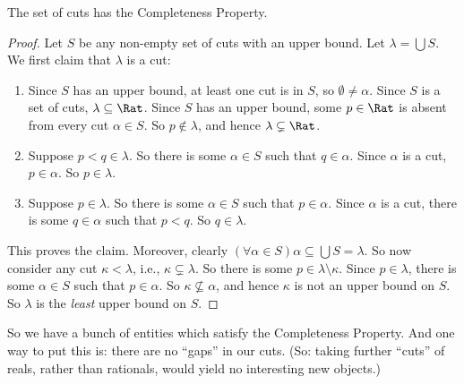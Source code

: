 \documentclass[../../../include/open-logic-section]{subfiles}
\begin{document}
\begin{thm}
The set of cuts has the Completeness Property. 
\end{thm}

\begin{proof}
Let $S$ be any non-empty set of cuts with an upper bound. Let $\lambda
= \bigcup S$. 
We first claim that $\lambda$ is a cut:
\begin{enumerate}
\item Since $S$ has an upper bound, at least one cut is in $S$, so
$\emptyset \neq \alpha$. Since $S$ is a set of cuts, $\lambda
\subseteq \Rat$. Since $S$ has an upper bound, some $p \in \Rat$ is
absent from every cut $\alpha \in S$. So $p\notin \lambda$, and hence
$\lambda \subsetneq \Rat$.
\item Suppose $p < q \in \lambda$. So there is some $\alpha \in S$
such that $q \in \alpha$. Since $\alpha$ is a cut, $p \in \alpha$. So
$p \in \lambda$.
\item Suppose $p \in \lambda$. So there is some $\alpha \in S$ such
that $p \in \alpha$. Since $\alpha$ is a cut, there is some $q \in
\alpha$ such that $p < q$. So $q \in \lambda$. 
\end{enumerate}
This proves the claim. Moreover, clearly $(\forall \alpha \in S)\alpha
\subseteq \bigcup S = \lambda$. So now consider any cut $\kappa <
\lambda$, i.e., $\kappa \subsetneq \lambda$. So there is some $p \in
\lambda \setminus \kappa$. Since $p \in \lambda$, there is some
$\alpha \in S$ such that $p \in \alpha$. So $\kappa \nsubseteq
\alpha$, and hence $\kappa$ is not an upper bound on $S$. So $\lambda$
is the \emph{least} upper bound on $S$.
\end{proof}

So we have a bunch of entities which satisfy the Completeness
Property. And one way to put this is: there are no ``gaps'' in our
cuts. (So: taking further ``cuts'' of reals, rather than rationals,
would yield no interesting new objects.)
\end{document}

